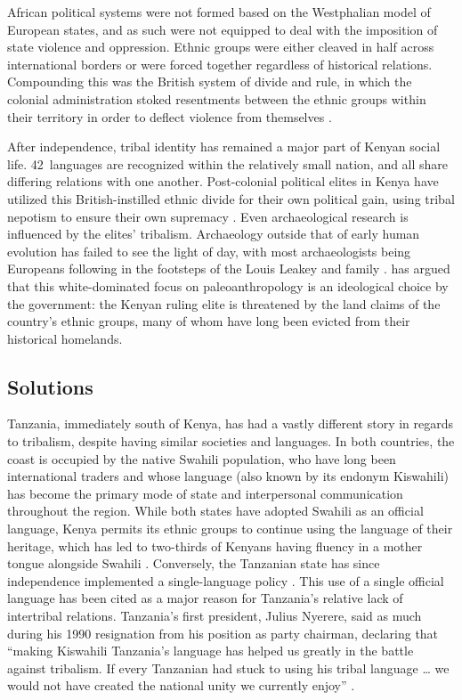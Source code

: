\documentclass{../../../coursework}
\begin{document}
African political systems were not formed based on the Westphalian model of
European states, and as such were not equipped to deal with the imposition of
state violence and oppression. Ethnic groups were either cleaved in half
across international borders or were forced together regardless of historical
relations. Compounding this was the British system of divide and rule, in
which the colonial administration stoked resentments between the ethnic groups
within their territory in order to deflect violence from themselves
\parencite{Wesseling1996}.

After independence, tribal identity has remained a major part of Kenyan social
life. 42~languages are recognized within the relatively small nation, and all
share differing relations with one another. Post-colonial political elites in
Kenya have utilized this British-instilled ethnic divide for their own
political gain, using tribal nepotism to ensure their own supremacy
\parencite{Orvis2001}. Even archaeological research is influenced by the
elites' tribalism. Archaeology outside that of early human evolution has
failed to see the light of day, with most archaeologists being Europeans
following in the footsteps of the Louis Leakey and family \parencite{Koff1997}.
\textcite{Schmidt1995} has argued that this white-dominated focus on
paleoanthropology is an ideological choice by the government: the Kenyan
ruling elite is threatened by the land claims of the country's ethnic groups,
many of whom have long been evicted from their historical homelands.

\subsection{Solutions}

Tanzania, immediately south of Kenya, has had a vastly different story in
regards to tribalism, despite having similar societies and languages. In both
countries, the coast is occupied by the native Swahili population, who have
long been international traders and whose language (also known by its endonym
Kiswahili) has become the primary mode of state and interpersonal
communication throughout the region. While both states have adopted Swahili as
an official language, Kenya permits its ethnic groups to continue using the
language of their heritage, which has led to two-thirds of Kenyans having
fluency in a mother tongue alongside Swahili \parencite{Githiora2008}.
Conversely, the Tanzanian state has since independence implemented a
single-language policy \parencite{Topan2008}. This use of a single official
language has been cited as a major reason for Tanzania's relative lack of
intertribal relations. Tanzania's first president, Julius Nyerere, said as
much during his 1990 resignation from his position as party chairman,
declaring that ``making Kiswahili Tanzania's language has helped us greatly in
the battle against tribalism. If every Tanzanian had stuck to using his tribal
language … we would not have created the national unity we currently enjoy''
\parencites{Nyerere1990}[cited in][]{Topan2008}.
\end{document}
